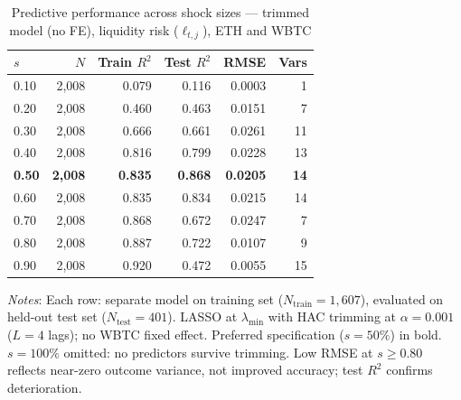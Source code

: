\documentclass[a4paper,UKenglish,cleveref, autoref, thm-restate]{informs3}
\begin{document}
\FloatBarrier 
\begin{table}[ht]
\centering
\begin{threeparttable}
\caption{Predictive performance across shock sizes ---
         trimmed model (no FE), liquidity risk
         ($\ell_{t,j}$), ETH and WBTC}
\label{tab:model_comparison_allsizes}
\begin{tabular}{lrrrrr}
\toprule
$s$
    & $N$
    & Train $R^2$
    & Test $R^2$
    & RMSE
    & Vars \\
\midrule
0.10 & 2{,}008 & 0.079 & 0.116 & 0.0003 &  1 \\
0.20 & 2{,}008 & 0.460 & 0.463 & 0.0151 &  7 \\
0.30 & 2{,}008 & 0.666 & 0.661 & 0.0261 & 11 \\
0.40 & 2{,}008 & 0.816 & 0.799 & 0.0228 & 13 \\
\textbf{0.50} & \textbf{2{,}008} & \textbf{0.835} &
    \textbf{0.868} & \textbf{0.0205} & \textbf{14} \\
0.60 & 2{,}008 & 0.835 & 0.834 & 0.0215 & 14 \\
0.70 & 2{,}008 & 0.868 & 0.672 & 0.0247 &  7 \\
0.80 & 2{,}008 & 0.887 & 0.722 & 0.0107 &  9 \\
0.90 & 2{,}008 & 0.920 & 0.472 & 0.0055 & 15 \\
\bottomrule
\end{tabular}
\begin{tablenotes}[flushleft]
\setlength{\itemsep}{0pt}
\setlength{\parsep}{0pt}
\scriptsize
\item \textit{Notes}: Each row: separate model on training
set ($N_{\text{train}} = 1{,}607$), evaluated on held-out
test set ($N_{\text{test}} = 401$). LASSO at $\lambda_{\min}$
with HAC trimming at $\alpha = 0.001$ ($L = 4$ lags); no
WBTC fixed effect. Preferred specification ($s = 50\%$) in
bold. $s = 100\%$ omitted: no predictors survive trimming.
Low RMSE at $s \geq 0.80$ reflects near-zero outcome
variance, not improved accuracy; test $R^2$ confirms
deterioration.
\end{tablenotes}
\end{threeparttable}
\end{table}


\end{document}
